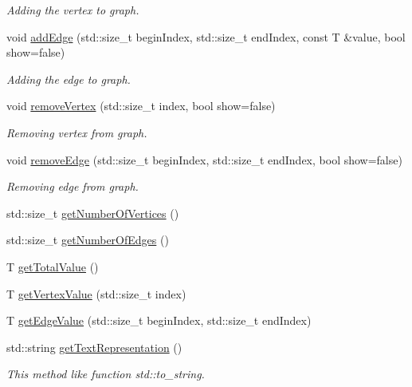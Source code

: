 \begin{DoxyCompactItemize}
\begin{DoxyCompactList}\small\item\em Adding the vertex to graph. \end{DoxyCompactList}\item 
void \mbox{\hyperlink{classgm_1_1_graph_matrix_a0500fe2b6a585690c33ca4ee182cbdea}{add\+Edge}} (std\+::size\+\_\+t begin\+Index, std\+::size\+\_\+t end\+Index, const T \&value, bool show=false)
\begin{DoxyCompactList}\small\item\em Adding the edge to graph. \end{DoxyCompactList}\item 
void \mbox{\hyperlink{classgm_1_1_graph_matrix_a43883f2cb97bc0286809be6fc8972838}{remove\+Vertex}} (std\+::size\+\_\+t index, bool show=false)
\begin{DoxyCompactList}\small\item\em Removing vertex from graph. \end{DoxyCompactList}\item 
void \mbox{\hyperlink{classgm_1_1_graph_matrix_aaee8cb1c4d2bab6fcba5f3fc64852bfd}{remove\+Edge}} (std\+::size\+\_\+t begin\+Index, std\+::size\+\_\+t end\+Index, bool show=false)
\begin{DoxyCompactList}\small\item\em Removing edge from graph. \end{DoxyCompactList}\item 
std\+::size\+\_\+t \mbox{\hyperlink{classgm_1_1_graph_matrix_a4efd9cd32511a16462cbbb22f9a5c37b}{get\+Number\+Of\+Vertices}} ()
\item 
std\+::size\+\_\+t \mbox{\hyperlink{classgm_1_1_graph_matrix_a4c240da5b6fb8ca0f0b65b179fcddf60}{get\+Number\+Of\+Edges}} ()
\item 
T \mbox{\hyperlink{classgm_1_1_graph_matrix_a2dd4beb317ef1742df02eee6581c1194}{get\+Total\+Value}} ()
\item 
T \mbox{\hyperlink{classgm_1_1_graph_matrix_adacccfacb1c46e0fa0ca173846f48a11}{get\+Vertex\+Value}} (std\+::size\+\_\+t index)
\item 
T \mbox{\hyperlink{classgm_1_1_graph_matrix_a57fbb70b98bfdd89400afaaac7af20ec}{get\+Edge\+Value}} (std\+::size\+\_\+t begin\+Index, std\+::size\+\_\+t end\+Index)
\item 
std\+::string \mbox{\hyperlink{classgm_1_1_graph_matrix_a58ac0e38794e668383319945b3c59f08}{get\+Text\+Representation}} ()
\begin{DoxyCompactList}\small\item\em This method like function std\+::to\+\_\+string. \end{DoxyCompactList}\item 

\end{DoxyCompactItemize}
